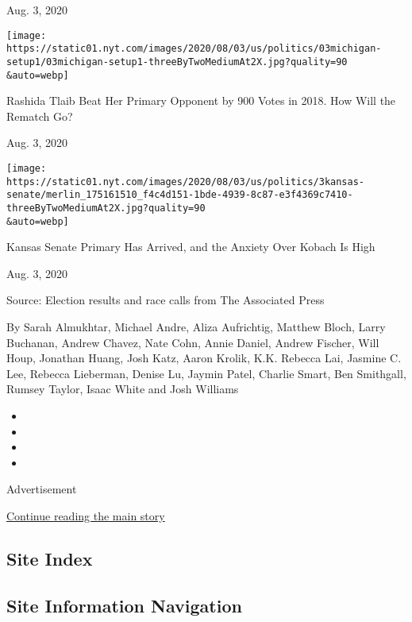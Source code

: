 Aug. 3, 2020

\href{https://www.nytimes.com/2020/08/03/us/politics/michigan-primary-rashida-tlaib-brenda-jones.html?action=click\&module=ELEX_results\&pgtype=Interactive\&region=RelatedCoverage}{}

\texttt{[image: https://static01.nyt.com/images/2020/08/03/us/politics/03michigan-setup1/03michigan-setup1-threeByTwoMediumAt2X.jpg?quality=90\\\&auto=webp]}

Rashida Tlaib Beat Her Primary Opponent by 900 Votes in 2018. How Will
the Rematch Go?

Aug. 3, 2020

\href{https://www.nytimes.com/2020/08/03/us/politics/kris-kobach-kansas-senate-primary.html?action=click\&module=ELEX_results\&pgtype=Interactive\&region=RelatedCoverage}{}

\texttt{[image: https://static01.nyt.com/images/2020/08/03/us/politics/3kansas-senate/merlin\_175161510\_f4c4d151-1bde-4939-8c87-e3f4369c7410-threeByTwoMediumAt2X.jpg?quality=90\\\&auto=webp]}

Kansas Senate Primary Has Arrived, and the Anxiety Over Kobach Is High

Aug. 3, 2020

Source: Election results and race calls from The Associated Press

By Sarah Almukhtar, Michael Andre, Aliza Aufrichtig, Matthew Bloch,
Larry Buchanan, Andrew Chavez, Nate Cohn, Annie Daniel, Andrew Fischer,
Will Houp, Jonathan Huang, Josh Katz, Aaron Krolik, K.K. Rebecca Lai,
Jasmine C. Lee, Rebecca Lieberman, Denise Lu, Jaymin Patel, Charlie
Smart, Ben Smithgall, Rumsey Taylor, Isaac White and Josh Williams

\begin{itemize}
\item
\item
\item
\item
\end{itemize}

Advertisement

\protect\hyperlink{after-bottom}{Continue reading the main story}

\hypertarget{site-index}{%
\subsection{Site Index}\label{site-index}}

\hypertarget{site-information-navigation}{%
\subsection{Site Information
Navigation}\label{site-information-navigation}}

